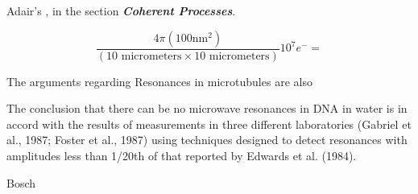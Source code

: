 \documentclass[paper.tex]{subfiles}
\begin{document}
Adair's \cite{Vibrational2002}, in the section {\it \bf Coherent Processes}. 

$$\frac{4 \pi (100 \text{nm}^2)}{(10 \text{ micrometers} \times 10 \text{ micrometers})} 10^7 e^- = $$

The arguments regarding Resonances in microtubules are also 

\cite{Vibrational2002}
The conclusion that there can be no microwave resonances in DNA in water is in accord with the results of
measurements in three different laboratories (Gabriel et al.,
1987; Foster et al., 1987) using techniques designed to
detect resonances with amplitudes less than 1/20th of that
reported by Edwards et al. (1984).





Bosch \cite{Studies1985}
\end{document}

